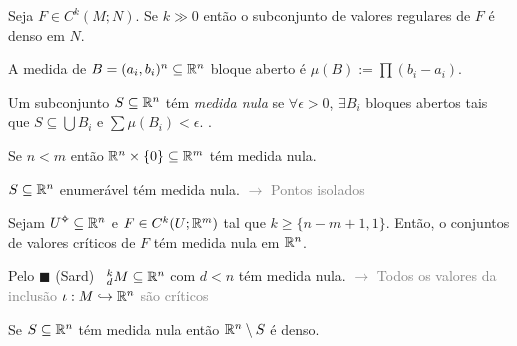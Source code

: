\begin{theorem}
    Seja \(F\in C^k(M;N)\). Se \(k \gg 0\) então o subconjunto de valores regulares de \(F\) é denso em \(N\).%
\end{theorem}

\begin{note}
    A medida de \(B= (a_i,b_i)^n\subseteq \mathbb{R}^n\) bloque aberto é \(\mu(B):= \prod (b_i-a_i)\).
\end{note}

\begin{definition}
    Um subconjunto \(S\subseteq \mathbb{R}^n\) tém \emph{medida nula} se \(\forall \epsilon >0\),  \(\exists B_i\) bloques abertos tais que  \(S\subseteq \bigcup B_i\) e \(\sum \mu(B_i)< \epsilon\). .  
\end{definition}

\begin{example}
    Se \(n<m\) então \(\mathbb{R}^n\times \{0\}\subseteq \mathbb{R}^m\) tém medida nula.   
\end{example}
\begin{example}
    \(S\subseteq \mathbb{R}^n\) enumerável tém medida nula.  \textcolor{gray}{\(\rightarrow\) Pontos isolados} 
\end{example}
\begin{theorem}
    Sejam \(U\ab\subseteq \R^n\) e \(F\in C^k(U; \mathbb{R}^m)\) tal que \(k\geq \{n-m+1, 1\}\). Então, o conjuntos de valores críticos de \(F\) tém medida nula em \(\mathbb{R}^n\). 
\end{theorem}

\begin{example}
    Pelo \(\blacksquare\) (Sard) \  \(^k_d M\subseteq \mathbb{R}^n\) com \(d<n\) tém medida nula. \textcolor{gray}{\(\rightarrow\) Todos os valores da inclusão \(\iota : M \hookrightarrow \mathbb{R}^n\) são críticos}
\end{example}

\begin{exercise}
    Se \(S\subseteq \mathbb{R}^n \) tém medida nula então \(\mathbb{R}^n\setminus S \) é denso. 
\end{exercise}

